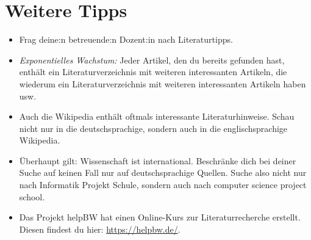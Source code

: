 \documentclass{../cssheet}
\begin{document}
\section{Weitere Tipps}
\begin{itemize}
\item Frag deine:n betreuende:n Dozent:in nach Literaturtipps.
\item \emph{Exponentielles Wachstum:} Jeder Artikel, den du bereits gefunden hast, enthält ein Literaturverzeichnis mit weiteren interessanten Artikeln, die wiederum ein Literaturverzeichnis mit weiteren interessanten Artikeln haben usw.
\item Auch die Wikipedia enthält oftmals interessante Literaturhinweise. Schau nicht nur in die deutschsprachige, sondern auch in die englischsprachige Wikipedia.
\item Überhaupt gilt: Wissenschaft ist international. Beschränke dich bei deiner Suche auf keinen Fall nur auf deutschsprachige Quellen. Suche also nicht nur nach \glqq{}Informatik Projekt Schule\grqq{}, sondern auch nach \glqq{}computer science project school\grqq{}.
\item Das Projekt helpBW hat einen Online-Kurs zur Literaturrecherche erstellt. Diesen findest du hier: \url{https://helpbw.de/}.

\end{itemize}

\vspace*{10mm}

\printlicense

\printsocials
\end{document}
